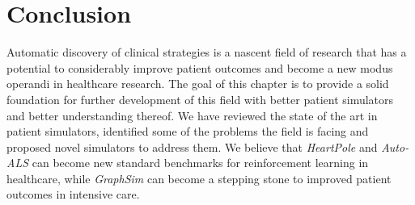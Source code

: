 \section{Conclusion}
\label{sec:conclusion}

Automatic discovery of clinical strategies is a nascent field of research that has a potential to considerably improve patient outcomes and become a new modus operandi in healthcare research.
The goal of this chapter is to provide a solid foundation for further development of this field with better patient simulators and better understanding thereof.
We have reviewed the state of the art in patient simulators, identified some of the problems the field is facing and proposed novel simulators to address them.
We believe that \emph{HeartPole} and \emph{Auto-ALS} can become new standard benchmarks for reinforcement learning in healthcare, while \emph{GraphSim} can become a stepping stone to improved patient outcomes in intensive care.